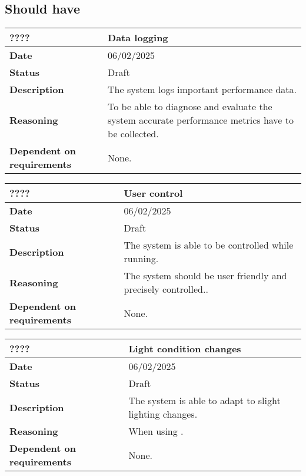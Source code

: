 \documentclass{article}
\begin{document}
\subsection{Should have}
\begin{table}[H]
    \renewcommand{\arraystretch}{1.3}
    \begin{tabular}{|l|p{10cm}|}
        \hline
        \rowcolor{gray!50}
        \textbf{????} & \textbf{Data logging} \\ \hline
        \textbf{Date} & 06/02/2025 \\ \hline
        \textbf{Status} & Draft \\ \hline
        \textbf{Description} & The system logs important performance data. \\ \hline
        \textbf{Reasoning} & To be able to diagnose and evaluate the system accurate performance metrics have to be collected. \\ \hline
        \textbf{Dependent on requirements} & None. \\ \hline
    \end{tabular}
\end{table}

\begin{table}[H]
    \renewcommand{\arraystretch}{1.3}
    \begin{tabular}{|l|p{10cm}|}
        \hline
        \rowcolor{gray!50}
        \textbf{????} & \textbf{User control} \\ \hline
        \textbf{Date} & 06/02/2025 \\ \hline
        \textbf{Status} & Draft \\ \hline
        \textbf{Description} & The system is able to be controlled while running. \\ \hline
        \textbf{Reasoning} & The system should be user friendly and precisely controlled.. \\ \hline
        \textbf{Dependent on requirements} & None. \\ \hline
    \end{tabular}
\end{table}

\begin{table}[H]
    \renewcommand{\arraystretch}{1.3}
    \begin{tabular}{|l|p{10cm}|}
        \hline
        \rowcolor{gray!50}
        \textbf{????} & \textbf{Light condition changes} \\ \hline
        \textbf{Date} & 06/02/2025 \\ \hline
        \textbf{Status} & Draft \\ \hline
        \textbf{Description} & The system is able to adapt to slight lighting changes. \\ \hline
        \textbf{Reasoning} & When using . \\ \hline
        \textbf{Dependent on requirements} & None. \\ \hline
    \end{tabular}
\end{table}
\end{document}
